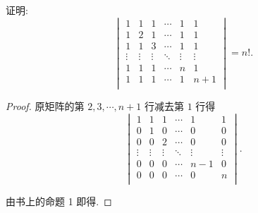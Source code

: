 \documentclass{ctexart}
\begin{document}
\begin{exercise}[1.3]
    证明:
    \[\begin{vmatrix}
    1 & 1 & 1 & \cdots & 1 & 1 \\
    1 & 2 & 1 & \cdots & 1 & 1 \\
    1 & 1 & 3 & \cdots & 1 & 1 \\
    \vdots & \vdots & \vdots & \ddots & \vdots & \vdots \\
    1 & 1 & 1 & \cdots  & n & 1 \\
    1 & 1 & 1 & \cdots  & 1 & n+1 \\
\end{vmatrix}=n!.\]
\end{exercise}
\begin{proof}
    原矩阵的第 $2,3,\cdots,n+1$ 行减去第 $1$ 行得
    \[\begin{vmatrix}
        1 & 1 & 1 & \cdots & 1 & 1 \\
        0 & 1 & 0 & \cdots & 0 & 0 \\
        0 & 0 & 2 & \cdots & 0 & 0 \\
        \vdots & \vdots & \vdots & \ddots & \vdots & \vdots \\
        0 & 0 & 0 & \cdots  & n-1 & 0 \\
        0 & 0 & 0 & \cdots  & 0 & n \\
    \end{vmatrix}.\]

    由书上的命题 1 即得.
\end{proof}
\end{document}
